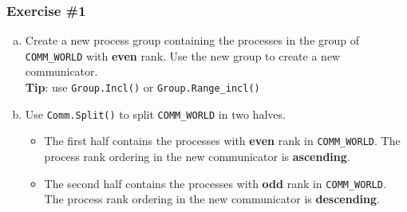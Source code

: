 \begin{frame}
  \frametitle{Exercise \#1}
  \begin{enumerate}[a)]
  \item Create a new process group containing the processes in the
    group of \texttt{COMM\_WORLD} with \textbf{even} rank. Use the new
    group to create a new communicator.\\
    \textbf{Tip}: use \texttt{Group.Incl()} or \texttt{Group.Range\_incl()}
  \item Use \texttt{Comm.Split()} to split \texttt{COMM\_WORLD} in two halves.
    \begin{itemize}
    \item The first half contains the processes with \textbf{even} rank
      in \texttt{COMM\_WORLD}. The process rank ordering in the new
      communicator is \textbf{ascending}.
    \item The second half contains the processes with \textbf{odd} rank
      in \texttt{COMM\_WORLD}. The process rank ordering in the new
      communicator is \textbf{descending}.
  \end{itemize}
  \end{enumerate}
\end{frame}
